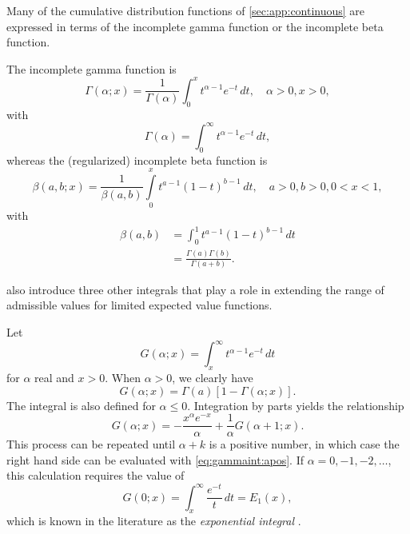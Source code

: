 \documentclass[x11names]{article}
\begin{document}
Many of the cumulative distribution functions of
\autoref{sec:app:continuous} are expressed in terms of the incomplete
gamma function or the incomplete beta function.

The incomplete gamma function is
\begin{equation}
  \label{eq:pgamma}
  \Gamma(\alpha; x) = \frac{1}{\Gamma(\alpha)}
  \int_0^x t^{\alpha - 1} e^{-t}\, dt, \quad \alpha > 0, x > 0,
\end{equation}
with
\begin{equation*}
  \Gamma(\alpha) = \int_0^\infty t^{\alpha - 1} e^{-t}\, dt,
\end{equation*}
whereas the (regularized) incomplete beta function is
\begin{equation}
  \label{eq:pbeta}
  \beta(a, b; x) = \frac{1}{\beta(a, b)}
  \int\limits_0^x t^{a - 1} (1 - t)^{b - 1}\, dt, \quad a > 0, b > 0, 0 < x < 1,
\end{equation}
with
\begin{align*}
  \beta(a, b)
  &= \int_0^1 t^{a - 1} (1 - t)^{b - 1}\, dt \\
  &= \frac{\Gamma(a) \Gamma(b)}{\Gamma(a + b)}.
\end{align*}

\citet{LossModels4e} also introduce three other integrals that play a
role in extending the range of admissible values for limited expected
value functions.

Let
\begin{equation}
  \label{eq:gammaint}
  G(\alpha; x) = \int_x^\infty t^{\alpha - 1} e^{-t}\, dt
\end{equation}
for $\alpha$ real and $x > 0$. When $\alpha > 0$, we clearly have
\begin{equation}
  \label{eq:gammaint:apos}
  G(\alpha; x) = \Gamma(a) [1 - \Gamma(\alpha; x)].
\end{equation}
The integral is also defined for $\alpha \le 0$. Integration by parts
yields the relationship
\begin{equation*}
  G(\alpha; x) = -\frac{x^\alpha e^{-x}}{\alpha}
  + \frac{1}{\alpha} G(\alpha + 1; x).
\end{equation*}
This process can be repeated until $\alpha + k$ is a positive number,
in which case the right hand side can be evaluated with
\eqref{eq:gammaint:apos}. If $\alpha = 0, -1, -2, \dots$, this
calculation requires the value of
\begin{equation*}
  \label{eq:expint}
  G(0; x) = \int_x^\infty \frac{e^{-t}}{t}\, dt = E_1(x),
\end{equation*}
which is known in the literature as the \emph{exponential integral}
\citep{Abramowitz:1972}.
\end{document}
